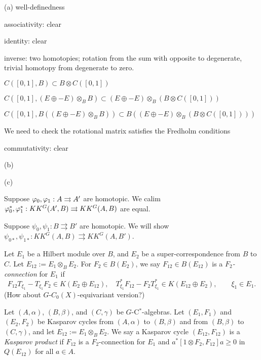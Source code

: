 \documentclass{../../large}
\begin{document}
\begin{pf}
(a)
well-definedness

associativity: clear

identity: clear

inverse: two homotopies; rotation from the sum with opposite to degenerate, trivial homotopy from degenerate to zero.

$C([0,1],B)\subset B\otimes C([0,1])$

$C([0,1],(E\oplus-E)\otimes_BB)\subset (E\oplus-E)\otimes_B(B\otimes C([0,1]))$

$C([0,1],B((E\oplus-E)\otimes_BB))\subset B((E\oplus-E)\otimes_B(B\otimes C([0,1])))$

We need to check the rotational matrix satisfies the Fredholm conditions

commutativity: clear

(b)

(c)

Suppose $\varphi_0,\varphi_1:A\rightrightarrows A'$ are homotopic.
We calim $\varphi_0^*,\varphi_1^*:KK^G(A',B)\rightrightarrows KK^G(A,B)$ are equal.

Suppose $\psi_0,\psi_1: B\rightrightarrows B'$ are homotopic.
We will show $\psi_{0*},\psi_{1*}:KK^G(A,B)\rightrightarrows KK^G(A,B')$.

\end{pf}




\begin{prb}
Let $E_1$ be a Hilbert module over $B$, and $E_2$ be a super-correspondence from $B$ to $C$.
Let $E_{12}:=E_1\otimes_B E_2$.
For $F_2\in B(E_2)$, we say $F_{12}\in B(E_{12})$ is a \emph{$F_2$-connection} for $E_1$ if
\[F_{12}T_{\xi_1}-T_{\xi_1}F_2\in K(E_2\oplus E_{12}),\quad
T_{\xi_1}^*F_{12}-F_2T_{\xi_1}^*\in K(E_{12}\oplus E_2),\qquad\xi_1\in E_1.\]
(How about $G$-$C_0(X)$-equivariant version?)

Let $(A,\alpha)$, $(B,\beta)$, and $(C,\gamma)$ be $G$-C$^*$-algebras.
Let $(E_1,F_1)$ and $(E_2,F_2)$ be Kasparov cycles from $(A,\alpha)$ to $(B,\beta)$ and from $(B,\beta)$ to $(C,\gamma)$, and let $E_{12}:=E_1\otimes_BE_2$.
We say a Kasparov cycle $(E_{12},F_{12})$ is a \emph{Kasparov product} if $F_{12}$ is a $F_2$-connection for $E_1$ and $a^*[1\otimes F_2,F_{12}]a\ge0$ in $Q(E_{12})$ for all $a\in A$.
\begin{parts}
\item 
\end{parts}
\end{prb}
\end{document}
